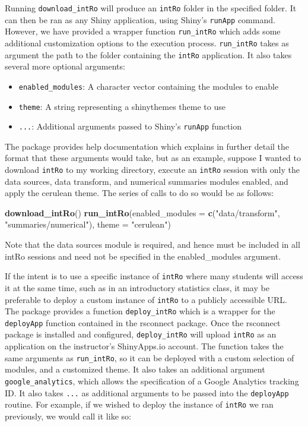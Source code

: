 \documentclass[12pt,]{article}
\providecommand{\tightlist}{%
  \setlength{\itemsep}{0pt}\setlength{\parskip}{0pt}}
\newenvironment{Shaded}{\begin{snugshade}}{\end{snugshade}}
\newcommand{\KeywordTok}[1]{\textcolor[rgb]{0.13,0.29,0.53}{\textbf{{#1}}}}
\newcommand{\DataTypeTok}[1]{\textcolor[rgb]{0.13,0.29,0.53}{{#1}}}
\newcommand{\StringTok}[1]{\textcolor[rgb]{0.31,0.60,0.02}{{#1}}}
\newcommand{\NormalTok}[1]{{#1}}
\begin{document}
Running \texttt{download\_intRo} will produce an \texttt{intRo} folder
in the specified folder. It can then be ran as any Shiny application,
using Shiny's \texttt{runApp} command. However, we have provided a
wrapper function \texttt{run\_intRo} which adds some additional
customization options to the execution process. \texttt{run\_intRo}
takes as argument the path to the folder containing the \texttt{intRo}
application. It also takes several more optional arguments:

\begin{itemize}
\tightlist
\item
  \texttt{enabled\_modules}: A character vector containing the modules
  to enable
\item
  \texttt{theme}: A string representing a shinythemes theme to use
\item
  \texttt{...}: Additional arguments passed to Shiny's \texttt{runApp}
  function
\end{itemize}

The package provides help documentation which explains in further detail
the format that these arguments would take, but as an example, suppose I
wanted to download \texttt{intRo} to my working directory, execute an
\texttt{intRo} session with only the data sources, data transform, and
numerical summaries modules enabled, and apply the cerulean theme. The
series of calls to do so would be as follows:

\begin{Shaded}
\begin{Highlighting}[]
\KeywordTok{download_intRo}\NormalTok{()}
\KeywordTok{run_intRo}\NormalTok{(}\DataTypeTok{enabled_modules =} \KeywordTok{c}\NormalTok{(}\StringTok{"data/transform"}\NormalTok{, }\StringTok{"summaries/numerical"}\NormalTok{), }
          \DataTypeTok{theme =} \StringTok{"cerulean"}\NormalTok{)}
\end{Highlighting}
\end{Shaded}

Note that the data sources module is required, and hence must be
included in all intRo sessions and need not be specified in the
enabled\_modules argument.

If the intent is to use a specific instance of \texttt{intRo} where many
students will access it at the same time, such as in an introductory
statistics class, it may be preferable to deploy a custom instance of
\texttt{intRo} to a publicly accessible URL. The package provides a
function \texttt{deploy\_intRo} which is a wrapper for the
\texttt{deployApp} function contained in the rsconnect package. Once the
rsconnect package is installed and configured, \texttt{deploy\_intRo}
will upload \texttt{intRo} as an application on the instructor's
ShinyApps.io account. The function takes the same arguments as
\texttt{run\_intRo}, so it can be deployed with a custom selection of
modules, and a customized theme. It also takes an additional argument
\texttt{google\_analytics}, which allows the specification of a Google
Analytics tracking ID. It also takes \texttt{...} as additional
arguments to be passed into the \texttt{deployApp} routine. For example,
if we wished to deploy the instance of \texttt{intRo} we ran previously,
we would call it like so:
\end{document}
